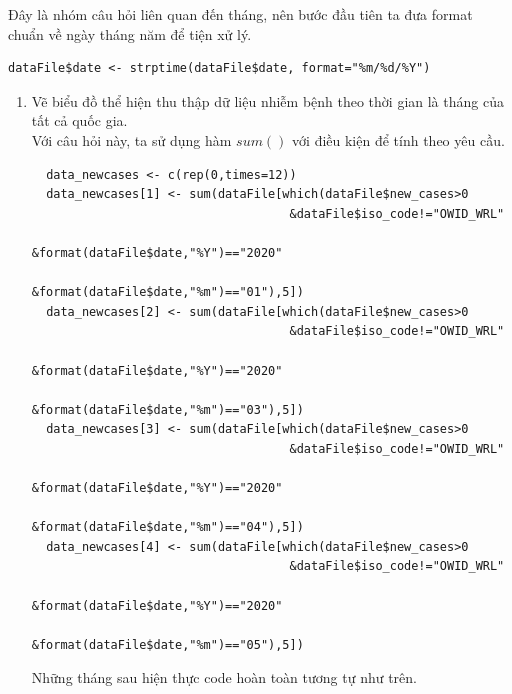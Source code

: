 \documentclass[a4paper]{article}
\theoremstyle{definition}
\begin{document}
Đây là nhóm câu hỏi liên quan đến tháng, nên bước đầu tiên ta đưa format chuẩn về ngày tháng năm để tiện xử lý.
\begin{lstlisting}
dataFile$date <- strptime(dataFile$date, format="%m/%d/%Y")
\end{lstlisting}
\begin{enumerate}[1)]
\item Vẽ biểu đồ thể hiện thu thập dữ liệu nhiễm bệnh theo thời gian là tháng của tất cả quốc gia.\\
Với câu hỏi này, ta sử dụng hàm $sum()$ với điều kiện để tính theo yêu cầu.
\begin{lstlisting}
  data_newcases <- c(rep(0,times=12))
  data_newcases[1] <- sum(dataFile[which(dataFile$new_cases>0
                                    &dataFile$iso_code!="OWID_WRL"
                                    &format(dataFile$date,"%Y")=="2020"
                                    &format(dataFile$date,"%m")=="01"),5])
  data_newcases[2] <- sum(dataFile[which(dataFile$new_cases>0
                                    &dataFile$iso_code!="OWID_WRL"
                                    &format(dataFile$date,"%Y")=="2020"
                                    &format(dataFile$date,"%m")=="03"),5])
  data_newcases[3] <- sum(dataFile[which(dataFile$new_cases>0
                                    &dataFile$iso_code!="OWID_WRL"
                                    &format(dataFile$date,"%Y")=="2020"
                                    &format(dataFile$date,"%m")=="04"),5])
  data_newcases[4] <- sum(dataFile[which(dataFile$new_cases>0
                                    &dataFile$iso_code!="OWID_WRL"
                                    &format(dataFile$date,"%Y")=="2020"
                                    &format(dataFile$date,"%m")=="05"),5])
\end{lstlisting}
Những tháng sau hiện thực code hoàn toàn tương tự như trên.


\end{enumerate}
\end{document}
